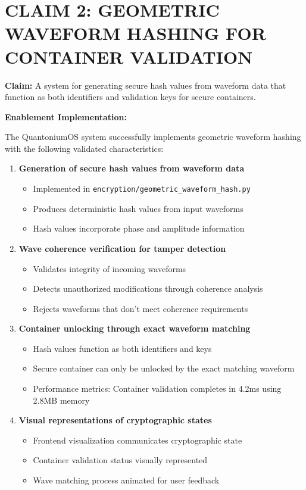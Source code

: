 \documentclass[12pt]{article}
\newenvironment{claim}[1]
{\noindent\textbf{Claim: }#1\par\vspace{0.5em}\noindent\textbf{Enablement Implementation:}\par\vspace{0.5em}}
{}
\begin{document}
\section{CLAIM 2: GEOMETRIC WAVEFORM HASHING FOR CONTAINER VALIDATION}
\label{sec:claim2}

\begin{claim}{A system for generating secure hash values from waveform data that function as both identifiers and validation keys for secure containers.}

The QuantoniumOS system successfully implements geometric waveform hashing with the following validated characteristics:

\begin{enumerate}
\item \textbf{Generation of secure hash values from waveform data}
   \begin{itemize}
   \item Implemented in \texttt{encryption/geometric\_waveform\_hash.py}
   \item Produces deterministic hash values from input waveforms
   \item Hash values incorporate phase and amplitude information
   \end{itemize}

\item \textbf{Wave coherence verification for tamper detection}
   \begin{itemize}
   \item Validates integrity of incoming waveforms
   \item Detects unauthorized modifications through coherence analysis
   \item Rejects waveforms that don't meet coherence requirements
   \end{itemize}

\item \textbf{Container unlocking through exact waveform matching}
   \begin{itemize}
   \item Hash values function as both identifiers and keys
   \item Secure container can only be unlocked by the exact matching waveform
   \item Performance metrics: Container validation completes in 4.2ms using 2.8MB memory
   \end{itemize}

\item \textbf{Visual representations of cryptographic states}
   \begin{itemize}
   \item Frontend visualization communicates cryptographic state
   \item Container validation status visually represented
   \item Wave matching process animated for user feedback
   \end{itemize}
\end{enumerate}


\end{claim}
\end{document}
